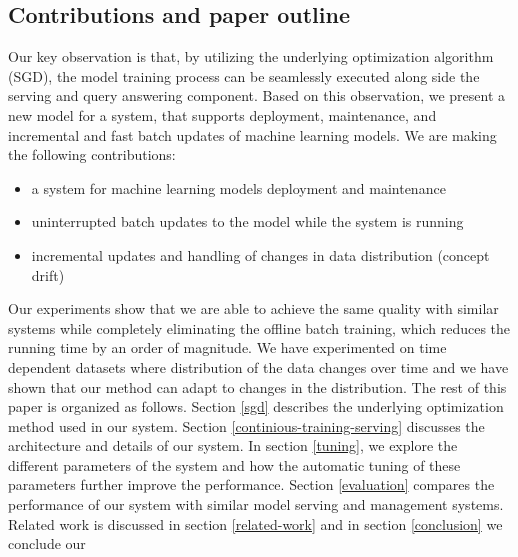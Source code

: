 \documentclass{sig-alternate-05-2015}
\begin{document}
\subsection{Contributions and paper outline}
Our key observation is that, by utilizing the underlying optimization algorithm (SGD), the model training process can be seamlessly executed along side the serving and query answering component.
Based on this observation, we present a new model for a system, that supports deployment, maintenance, and incremental and fast batch updates of machine learning models.
We are making the following contributions: 
\begin{itemize}
\item a system for machine learning models deployment and maintenance
\item uninterrupted batch updates to the model while the system is running
\item incremental updates and handling of changes in data distribution (concept drift) 
\end{itemize}
Our experiments show that we are able to achieve the same quality with similar systems while completely eliminating the offline batch training, which reduces the running time by an order of magnitude. 
We have experimented on time dependent datasets where distribution of the data changes over time and we have shown that our method can adapt to changes in the distribution.
The rest of this paper is organized as follows. 
Section \ref{sgd} describes the underlying optimization method used in our system. 
Section \ref{continious-training-serving} discusses the architecture and details of our system. 
In section \ref{tuning}, we explore the different parameters of the system and how the automatic tuning of these parameters further improve the performance.
Section \ref{evaluation} compares the performance of our system with similar model serving and management systems. 
Related work is discussed in section \ref{related-work} and in section \ref{conclusion} we conclude our 
\end{document}
